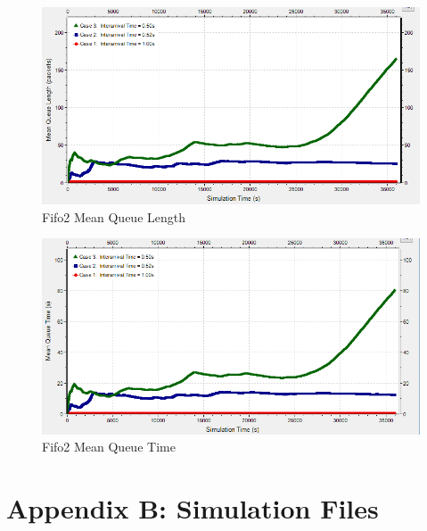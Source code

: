 \documentclass{article}
\begin{document}
\begin{figure}[h!]
	\begin{center}
	\includegraphics[scale=0.75]{Images/Fifo2_QueueLength.PNG}
	\vspace{-.25cm}
	\caption{Fifo2 Mean Queue Length}
	\label{fifo2_qlen}
	\end{center}
\end{figure}

\begin{figure}[h!]
	\begin{center}
	\includegraphics[scale=0.75]{Images/Fifo2_QueueTime.PNG}
	\vspace{-.25cm}
	\caption{Fifo2 Mean Queue Time}
	\label{fifo2_qtime}
	\end{center}
\end{figure}

\newpage
\clearpage
\section*{Appendix B:  Simulation Files}
\end{document}
